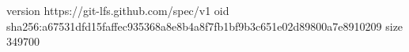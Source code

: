 version https://git-lfs.github.com/spec/v1
oid sha256:a67531dfd15faffec935368a8e8b4a8f7fb1bf9b3c651e02d89800a7e8910209
size 349700
